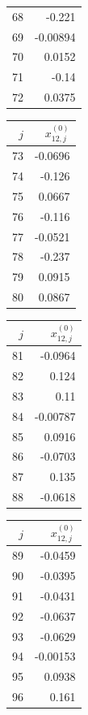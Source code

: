 {\begin{tabular}[t]{r|r}
68 & -0.221 \\
69 & -0.00894 \\
70 & 0.0152 \\
71 & -0.14 \\
72 & 0.0375
\end{tabular}\kern4pt
\begin{tabular}[t]{r|r}
$j$ & $x^{(0)}_{12,j}$ \\\hline
73 & -0.0696 \\
74 & -0.126 \\
75 & 0.0667 \\
76 & -0.116 \\
77 & -0.0521 \\
78 & -0.237 \\
79 & 0.0915 \\
80 & 0.0867
\end{tabular}\kern4pt
\begin{tabular}[t]{r|r}
$j$ & $x^{(0)}_{12,j}$ \\\hline
81 & -0.0964 \\
82 & 0.124 \\
83 & 0.11 \\
84 & -0.00787 \\
85 & 0.0916 \\
86 & -0.0703 \\
87 & 0.135 \\
88 & -0.0618
\end{tabular}\kern4pt
\begin{tabular}[t]{r|r}
$j$ & $x^{(0)}_{12,j}$ \\\hline
89 & -0.0459 \\
90 & -0.0395 \\
91 & -0.0431 \\
92 & -0.0637 \\
93 & -0.0629 \\
94 & -0.00153 \\
95 & 0.0938 \\
96 & 0.161
\end{tabular}}

